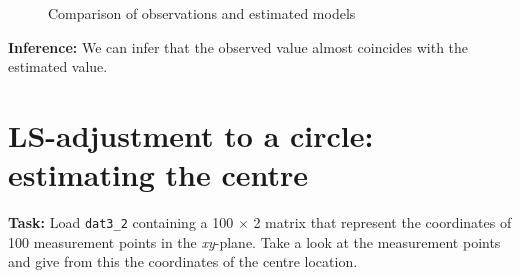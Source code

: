 \begin{figure}[H]
    \centering
    \qquad
    \caption{Comparison of observations and estimated models}
\end{figure}

\noindent \textbf{Inference:} We can infer that the observed value almost coincides with the estimated value. 


\section{ LS-adjustment to a circle: estimating the centre  }  \label{ LS-adjustment to a circle: estimating the centre }
\noindent \textbf{Task:} Load \texttt{dat3\_2} containing a 100 $\times$ 2 matrix that represent the coordinates of 100 measurement points in the \textit{xy}-plane. Take a look at the measurement points and give from this the coordinates of the centre location. 


